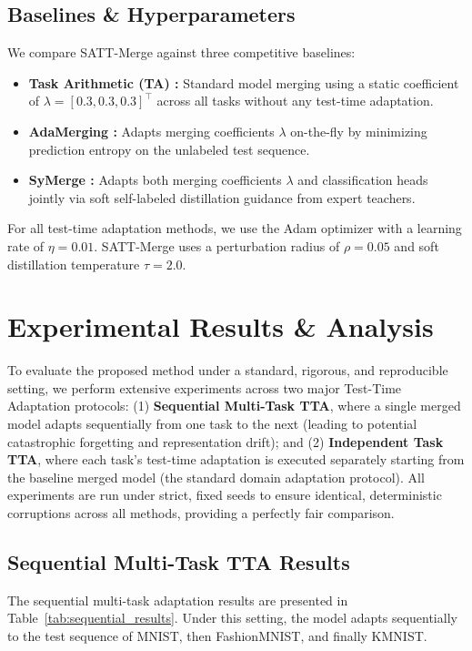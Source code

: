 \documentclass{article}
\begin{document}
\subsection{Baselines \& Hyperparameters}
We compare SATT-Merge against three competitive baselines:
\begin{itemize}
    \item \textbf{Task Arithmetic (TA) \cite{yang2023adamerging}:} Standard model merging using a static coefficient of $\lambda = [0.3, 0.3, 0.3]^\top$ across all tasks without any test-time adaptation.
    \item \textbf{AdaMerging \cite{yang2023adamerging}:} Adapts merging coefficients $\lambda$ on-the-fly by minimizing prediction entropy on the unlabeled test sequence.
    \item \textbf{SyMerge \cite{symerge2024}:} Adapts both merging coefficients $\lambda$ and classification heads jointly via soft self-labeled distillation guidance from expert teachers.
\end{itemize}

For all test-time adaptation methods, we use the Adam optimizer with a learning rate of $\eta = 0.01$. SATT-Merge uses a perturbation radius of $\rho = 0.05$ and soft distillation temperature $\tau = 2.0$.

\section{Experimental Results \& Analysis}
\label{sec:results}

To evaluate the proposed method under a standard, rigorous, and reproducible setting, we perform extensive experiments across two major Test-Time Adaptation protocols: (1) \textbf{Sequential Multi-Task TTA}, where a single merged model adapts sequentially from one task to the next (leading to potential catastrophic forgetting and representation drift); and (2) \textbf{Independent Task TTA}, where each task's test-time adaptation is executed separately starting from the baseline merged model (the standard domain adaptation protocol). All experiments are run under strict, fixed seeds to ensure identical, deterministic corruptions across all methods, providing a perfectly fair comparison.

\subsection{Sequential Multi-Task TTA Results}

The sequential multi-task adaptation results are presented in Table~\ref{tab:sequential_results}. Under this setting, the model adapts sequentially to the test sequence of MNIST, then FashionMNIST, and finally KMNIST. 
\end{document}
